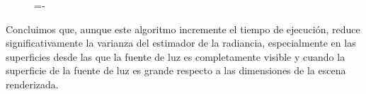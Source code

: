 \begin{figure}[h!]
  \lineskip=-\fboxrule
\end{figure}
Concluimos que, aunque este algoritmo incremente el tiempo de ejecución, reduce significativamente la varianza del estimador de la radiancia, especialmente en las superficies desde las que la fuente de luz es completamente visible y cuando la superficie de la fuente de luz es grande respecto a las dimensiones de la escena renderizada. 
 

